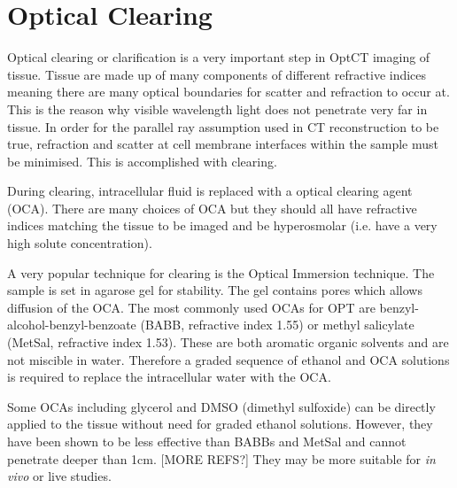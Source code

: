 \documentclass[12pt]{article}
\begin{document}






\newpage
\section{Optical Clearing}
\label{sec:clearing}

Optical clearing or clarification is a very important step in OptCT imaging of tissue. Tissue are made up of many components of different refractive indices meaning there are many optical boundaries for scatter and refraction to occur at. This is the reason why visible wavelength light does not penetrate very far in tissue. In order for the parallel ray assumption used in CT reconstruction to be true, refraction and scatter at cell membrane interfaces within the sample must be minimised. \cite{Oldham:2006} This is accomplished with clearing.

During clearing, intracellular  fluid is replaced with a optical clearing agent (OCA). There are many choices of OCA but they should all have refractive indices matching the tissue to be imaged and be hyperosmolar (i.e. have a very high solute concentration).
 
 
A very popular technique for clearing is the Optical Immersion technique. The sample is set in agarose gel for stability. The gel contains pores which allows diffusion of the OCA. The most commonly used OCAs for OPT are benzyl-alcohol-benzyl-benzoate (BABB, refractive index 1.55) or methyl salicylate (MetSal, refractive index 1.53). These are both aromatic organic solvents and are not miscible in water. Therefore a graded sequence of ethanol and OCA solutions is required to replace the intracellular water with the OCA. \cite{Oldham:2006} 

Some OCAs including glycerol and DMSO (dimethyl sulfoxide) can be directly applied to the tissue without need for graded ethanol solutions. However, they have been shown to be less effective than BABBs and MetSal and cannot penetrate deeper than 1cm. \cite{Oldham:2006} [MORE REFS?] They may be more suitable for \textit{in vivo} or live studies.
\end{document}

